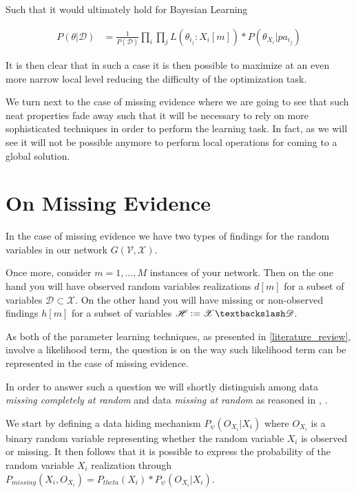 \documentclass[11pt]{article}
\begin{document}
\begin{article}
Such that it would ultimately hold for Bayesian Learning

\begin{align} 
P(\theta | \mathscr{D}) &= \frac{1}{P(\mathscr{D})} \prod_i \prod_j L(\theta_i_j : X_i[m]) * P(\theta_{X_i}|pa_i_j) \nonumber
\end{align}

It is then clear that in such a case it is then possible to
maximize at an even more narrow local level reducing the difficulty
of the optimization task.

We turn next to the case of missing evidence where we are going to
see that such neat properties fade away such that it will be
necessary to rely on more sophisticated techniques in order to
perform the learning task. In fact, as we will see it will not be
possible anymore to perform local operations for coming to a global
solution.

\section{On Missing Evidence}
\label{sec:org359e9ba}

In the case of missing evidence we have two types of findings for
the random variables in our network \(G(\mathscr{V}, \mathscr{X})\).

Once more, consider \(m = 1, ..., M\) instances of your network. Then
on the one hand you will have observed random variables realizations
\(d[m]\) for a subset of variables \(\mathscr{D} \subset
  \mathscr{X}\). On the other hand you will have missing or
non-observed findings \(h[m]\) for a subset of variables
\(\mathscr{H} \vcentcolon= \mathscr{X} \textbackslash \mathscr{D}\).

As both of the parameter learning techniques, as presented in
\ref{literature_review}, involve a likelihood term, the question is on
the way such likelihood term can be represented in the case of
missing evidence.

In order to answer such a question we will shortly distinguish among
data \emph{missing completely at random} and data \emph{missing at random} as
reasoned in \cite{little1976inference}, \cite{rubin1976inference}.

We start by defining a data hiding mechanism \(P_\psi(O_{X_i}|X_i)\) where
\(O_{X_i}\) is a binary random variable representing whether the
random variable \(X_i\) is observed or missing. It then follows that
it is possible to express the probability of the random variable
\(X_i\) realization through \(P_{missing}(X_i, O_{X_i}) = P_{theta}(X_i) *
  P_\psi(O_{X_i}|X_i)\).


\end{article}
\end{document}
